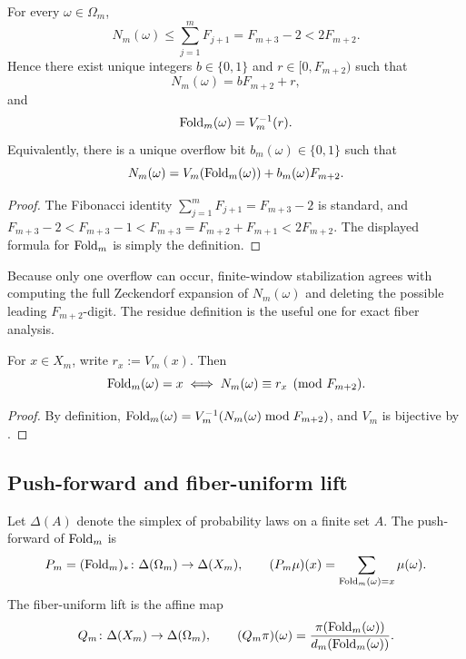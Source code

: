 \begin{proposition}
\label{prop:single-overflow}
For every \(\omega\in\Omega_m\),
\[
  N_m(\omega)\le \sum_{j=1}^m F_{j+1}=F_{m+3}-2<2F_{m+2}.
\]
Hence there exist unique integers \(b\in\{0,1\}\) and \(r\in[0,F_{m+2})\) such
that
\[
  N_m(\omega)=bF_{m+2}+r,
\]
and
\[
  \mathrm{Fold}_m(\omega)=V_m^{-1}(r).
\]
Equivalently, there is a unique overflow bit \(b_m(\omega)\in\{0,1\}\) such
that
\[
  N_m(\omega)=V_m(\mathrm{Fold}_m(\omega))+b_m(\omega)F_{m+2}.
\]
\end{proposition}

\begin{proof}
The Fibonacci identity
\(\sum_{j=1}^m F_{j+1}=F_{m+3}-2\) is standard, and
\(F_{m+3}-2<F_{m+3}-1<F_{m+3}=F_{m+2}+F_{m+1}<2F_{m+2}\).  The displayed
formula for \(\mathrm{Fold}_m\) is simply the definition.
\end{proof}

\begin{remark}
\label{rem:prefix-normalization}
Because only one overflow can occur, finite-window stabilization agrees with
computing the full Zeckendorf expansion of \(N_m(\omega)\) and deleting the
possible leading \(F_{m+2}\)-digit.
The residue definition is the useful one for exact fiber analysis.
\end{remark}

\begin{corollary}
\label{cor:residue-characterization}
For \(x\in X_m\), write \(r_x:=V_m(x)\).  Then
\[
  \mathrm{Fold}_m(\omega)=x
  \iff
  N_m(\omega)\equiv r_x \pmod{F_{m+2}}.
\]
\end{corollary}

\begin{proof}
By definition,
\(\mathrm{Fold}_m(\omega)=V_m^{-1}(N_m(\omega)\bmod F_{m+2})\), and \(V_m\) is
bijective by .
\end{proof}

\subsection{Push-forward and fiber-uniform lift}

\begin{definition}
\label{def:pushforward-lift}
Let \(\Delta(A)\) denote the simplex of probability laws on a finite set \(A\).
The push-forward of \(\mathrm{Fold}_m\) is
\[
  P_m=(\mathrm{Fold}_m)_*\colon \Delta(\Omega_m)\to\Delta(X_m),
  \qquad
  (P_m\mu)(x)=\sum_{\mathrm{Fold}_m(\omega)=x}\mu(\omega).
\]
The fiber-uniform lift is the affine map
\[
  Q_m\colon \Delta(X_m)\to\Delta(\Omega_m),
  \qquad
  (Q_m\pi)(\omega)=\frac{\pi(\mathrm{Fold}_m(\omega))}{d_m(\mathrm{Fold}_m(\omega))}.
\]
\end{definition}

